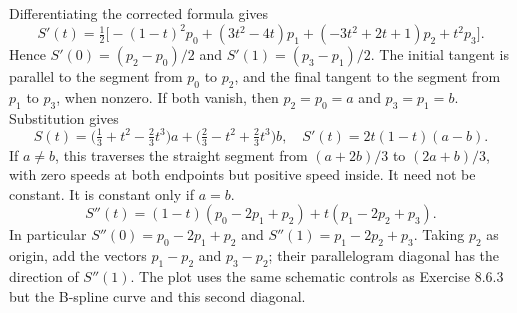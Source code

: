 Differentiating the corrected formula gives
\[
 S'(t)=\tfrac12\big[-(1-t)^2p_0+(3t^2-4t)p_1
                  +(-3t^2+2t+1)p_2+t^2p_3\big].
\]
Hence $S'(0)=(p_2-p_0)/2$ and $S'(1)=(p_3-p_1)/2$.
The initial tangent is parallel to the segment from $p_0$ to $p_2$,
and the final tangent to the segment from $p_1$ to $p_3$, when nonzero.
If both vanish, then $p_2=p_0=a$ and $p_3=p_1=b$.
Substitution gives
\[
 S(t)=\big(\tfrac13+t^2-\tfrac23t^3\big)a
     +\big(\tfrac23-t^2+\tfrac23t^3\big)b,
 \quad S'(t)=2t(1-t)(a-b).
\]
If $a\ne b$, this traverses the straight segment from $(a+2b)/3$ to
$(2a+b)/3$, with zero speeds at both endpoints but positive speed inside.
It need not be constant. It is constant only if $a=b$.
\[
 S''(t)=(1-t)(p_0-2p_1+p_2)+t(p_1-2p_2+p_3).
\]
In particular $S''(0)=p_0-2p_1+p_2$ and
$S''(1)=p_1-2p_2+p_3$.
Taking $p_2$ as origin, add the vectors $p_1-p_2$ and $p_3-p_2$;
their parallelogram diagonal has the direction of $S''(1)$.
The plot uses the same schematic controls as Exercise 8.6.3 but the
B-spline curve and this second diagonal.
